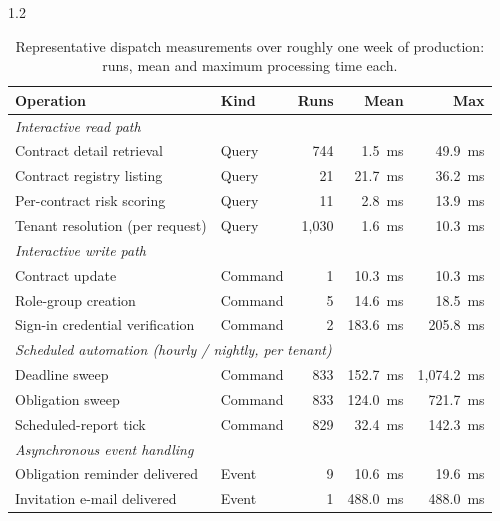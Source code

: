\begin{spacing}{1.2}
\begin{table}[H]
  \centering
  \caption[Dispatch measurements from the production pilot.]
          {Representative dispatch measurements over roughly one week of
           production: runs, mean and maximum processing time each.}
  \label{tab:runtime-perf}
  \footnotesize
  \begin{tabularx}{\linewidth}{|X|l|r|r|r|}
    \hline
    \textbf{Operation} & \textbf{Kind} & \textbf{Runs}
      & \textbf{Mean} & \textbf{Max} \\
    \hline\hline
    \multicolumn{5}{|l|}{\textit{Interactive read path}} \\
    \hline
    Contract detail retrieval & Query & 744 & 1.5~ms & 49.9~ms \\
    \hline
    Contract registry listing & Query & 21 & 21.7~ms & 36.2~ms \\
    \hline
    Per-contract risk scoring & Query & 11 & 2.8~ms & 13.9~ms \\
    \hline
    Tenant resolution (per request) & Query & 1{,}030 & 1.6~ms & 10.3~ms \\
    \hline\hline
    \multicolumn{5}{|l|}{\textit{Interactive write path}} \\
    \hline
    Contract update & Command & 1 & 10.3~ms & 10.3~ms \\
    \hline
    Role-group creation & Command & 5 & 14.6~ms & 18.5~ms \\
    \hline
    Sign-in credential verification & Command & 2 & 183.6~ms & 205.8~ms \\
    \hline\hline
    \multicolumn{5}{|l|}{\textit{Scheduled automation (hourly / nightly, per tenant)}} \\
    \hline
    Deadline sweep & Command & 833 & 152.7~ms & 1{,}074.2~ms \\
    \hline
    Obligation sweep & Command & 833 & 124.0~ms & 721.7~ms \\
    \hline
    Scheduled-report tick & Command & 829 & 32.4~ms & 142.3~ms \\
    \hline\hline
    \multicolumn{5}{|l|}{\textit{Asynchronous event handling}} \\
    \hline
    Obligation reminder delivered & Event & 9 & 10.6~ms & 19.6~ms \\
    \hline
    Invitation e-mail delivered & Event & 1 & 488.0~ms & 488.0~ms \\
    \hline
  \end{tabularx}
\end{table}


\end{spacing}
